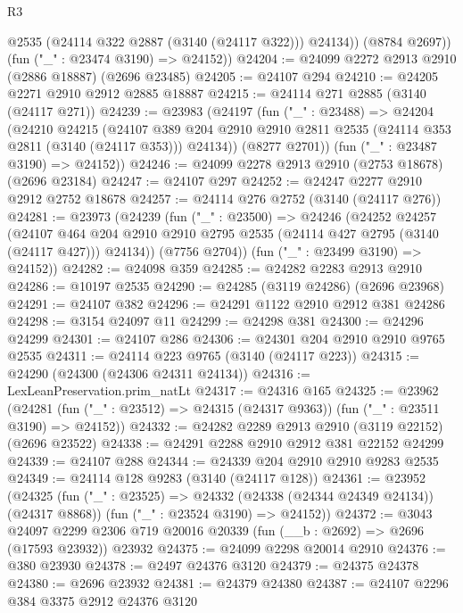 \begin{lexlean}{R3}
\begin{coremodule}
            @2535
            (@24114 @322 @2887 (@3140 (@24117 @322)))
            @24134))
        (@8784 @2697))
      (fun ("_" : @23474 @3190) => @24152))
@24204 := @24099 @2272 @2913 @2910 (@2886 @18887) (@2696 @23485)
@24205 := @24107 @294
@24210 := @24205 @2271 @2910 @2912 @2885 @18887
@24215 := @24114 @271 @2885 (@3140 (@24117 @271))
@24239 := @23983
    (@24197
      (fun ("_" : @23488) =>
      @24204
        (@24210
          @24215
          (@24107
            @389
            @204
            @2910
            @2910
            @2811
            @2535
            (@24114 @353 @2811 (@3140 (@24117 @353)))
            @24134))
        (@8277 @2701))
      (fun ("_" : @23487 @3190) => @24152))
@24246 := @24099 @2278 @2913 @2910 (@2753 @18678) (@2696 @23184)
@24247 := @24107 @297
@24252 := @24247 @2277 @2910 @2912 @2752 @18678
@24257 := @24114 @276 @2752 (@3140 (@24117 @276))
@24281 := @23973
    (@24239
      (fun ("_" : @23500) =>
      @24246
        (@24252
          @24257
          (@24107
            @464
            @204
            @2910
            @2910
            @2795
            @2535
            (@24114 @427 @2795 (@3140 (@24117 @427)))
            @24134))
        (@7756 @2704))
      (fun ("_" : @23499 @3190) => @24152))
@24282 := @24098 @359
@24285 := @24282 @2283 @2913 @2910
@24286 := @10197 @2535
@24290 := @24285 (@3119 @24286) (@2696 @23968)
@24291 := @24107 @382
@24296 := @24291 @1122 @2910 @2912 @381 @24286
@24298 := @3154 @24097 @11
@24299 := @24298 @381
@24300 := @24296 @24299
@24301 := @24107 @286
@24306 := @24301 @204 @2910 @2910 @9765 @2535
@24311 := @24114 @223 @9765 (@3140 (@24117 @223))
@24315 := @24290 (@24300 (@24306 @24311 @24134))
@24316 := LexLeanPreservation.prim_natLt
@24317 := @24316 @165
@24325 := @23962
    (@24281 (fun ("_" : @23512) => @24315 (@24317 @9363)) (fun ("_" : @23511 @3190) => @24152))
@24332 := @24282 @2289 @2913 @2910 (@3119 @22152) (@2696 @23522)
@24338 := @24291 @2288 @2910 @2912 @381 @22152 @24299
@24339 := @24107 @288
@24344 := @24339 @204 @2910 @2910 @9283 @2535
@24349 := @24114 @128 @9283 (@3140 (@24117 @128))
@24361 := @23952
    (@24325
      (fun ("_" : @23525) => @24332 (@24338 (@24344 @24349 @24134)) (@24317 @8868))
      (fun ("_" : @23524 @3190) => @24152))
@24372 := @3043
    @24097
    @2299
    @2306
    @719
    @20016
    @20339
    (fun (__b : @2692) => @2696 (@17593 @23932))
    @23932
@24375 := @24099 @2298 @20014 @2910
@24376 := @380 @23930
@24378 := @2497 @24376 @3120
@24379 := @24375 @24378
@24380 := @2696 @23932
@24381 := @24379 @24380
@24387 := @24107 @2296 @384 @3375 @2912 @24376 @3120

\end{coremodule}
\end{lexlean}
